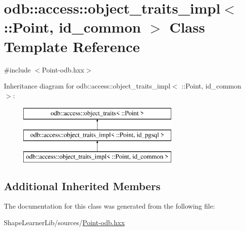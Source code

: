 \hypertarget{classodb_1_1access_1_1object__traits__impl_3_01_1_1_point_00_01id__common_01_4}{}\section{odb\+:\+:access\+:\+:object\+\_\+traits\+\_\+impl$<$ \+:\+:Point, id\+\_\+common $>$ Class Template Reference}
\label{classodb_1_1access_1_1object__traits__impl_3_01_1_1_point_00_01id__common_01_4}


{\ttfamily \#include $<$Point-\/odb.\+hxx$>$}

Inheritance diagram for odb\+:\+:access\+:\+:object\+\_\+traits\+\_\+impl$<$ \+:\+:Point, id\+\_\+common $>$\+:\begin{figure}[H]
\begin{center}
\leavevmode
\includegraphics[height=3.000000cm]{d5/de5/classodb_1_1access_1_1object__traits__impl_3_01_1_1_point_00_01id__common_01_4}
\end{center}
\end{figure}
\subsection*{Additional Inherited Members}


The documentation for this class was generated from the following file\+:\begin{DoxyCompactItemize}
\item 
Shape\+Learner\+Lib/sources/\hyperlink{_point-odb_8hxx}{Point-\/odb.\+hxx}\end{DoxyCompactItemize}
